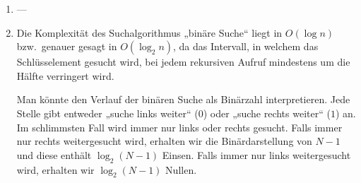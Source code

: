 \begin{enumerate}
    \item ---

    \item Die Komplexität des Suchalgorithmus „binäre Suche“ liegt in
      $O(\log n)$ bzw.\ genauer gesagt in $O(\log_2 n)$, da das Intervall, in
      welchem das Schlüsselement gesucht wird, bei jedem rekursiven Aufruf
      mindestens um die Hälfte verringert wird.

      Man könnte den Verlauf der binären Suche als Binärzahl interpretieren.
      Jede Stelle gibt entweder „suche links weiter“ ($0$) oder „suche rechts
      weiter“ ($1$) an. Im schlimmsten Fall wird immer nur links oder rechts
      gesucht. Falls immer nur rechts weitergesucht wird, erhalten wir die
      Binärdarstellung von $N-1$ und diese enthält $\log_2 (N-1)$ Einsen. Falls
      immer nur links weitergesucht wird, erhalten wir $\log_2 (N-1)$ Nullen.
\end{enumerate}
